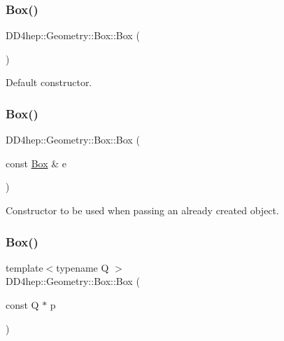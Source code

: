 \subsubsection{\texorpdfstring{Box()}{Box()}\hspace{0.1cm}{\footnotesize\ttfamily [1/6]}}
{\footnotesize\ttfamily D\+D4hep\+::\+Geometry\+::\+Box\+::\+Box (\begin{DoxyParamCaption}{ }\end{DoxyParamCaption})\hspace{0.3cm}{\ttfamily [default]}}



Default constructor. 

\hypertarget{class_d_d4hep_1_1_geometry_1_1_box_a98867373cf90b6be5409ce99a7688c3f}{}\label{class_d_d4hep_1_1_geometry_1_1_box_a98867373cf90b6be5409ce99a7688c3f} 
\subsubsection{\texorpdfstring{Box()}{Box()}\hspace{0.1cm}{\footnotesize\ttfamily [2/6]}}
{\footnotesize\ttfamily D\+D4hep\+::\+Geometry\+::\+Box\+::\+Box (\begin{DoxyParamCaption}\item[{const \hyperlink{class_d_d4hep_1_1_geometry_1_1_box}{Box} \&}]{e }\end{DoxyParamCaption})\hspace{0.3cm}{\ttfamily [default]}}



Constructor to be used when passing an already created object. 

\hypertarget{class_d_d4hep_1_1_geometry_1_1_box_a141cfb09875b7b8c33b84ff3531b753e}{}\label{class_d_d4hep_1_1_geometry_1_1_box_a141cfb09875b7b8c33b84ff3531b753e} 
\subsubsection{\texorpdfstring{Box()}{Box()}\hspace{0.1cm}{\footnotesize\ttfamily [3/6]}}
{\footnotesize\ttfamily template$<$typename Q $>$ \\
D\+D4hep\+::\+Geometry\+::\+Box\+::\+Box (\begin{DoxyParamCaption}\item[{const Q $\ast$}]{p }\end{DoxyParamCaption})\hspace{0.3cm}{\ttfamily [inline]}}



